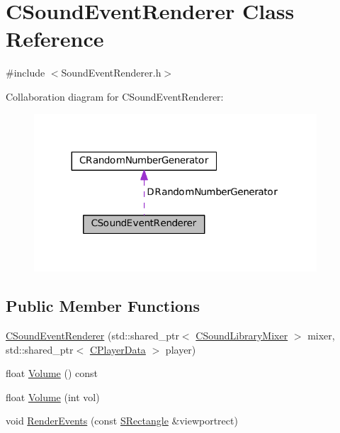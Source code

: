 \hypertarget{classCSoundEventRenderer}{}\section{C\+Sound\+Event\+Renderer Class Reference}
\label{classCSoundEventRenderer}


{\ttfamily \#include $<$Sound\+Event\+Renderer.\+h$>$}



Collaboration diagram for C\+Sound\+Event\+Renderer\+:
\nopagebreak
\begin{figure}[H]
\begin{center}
\leavevmode
\includegraphics[width=299pt]{classCSoundEventRenderer__coll__graph}
\end{center}
\end{figure}
\subsection*{Public Member Functions}
\begin{DoxyCompactItemize}
\item 
\hyperlink{classCSoundEventRenderer_a2a1c105a120bebf386b772a06c2a053a}{C\+Sound\+Event\+Renderer} (std\+::shared\+\_\+ptr$<$ \hyperlink{classCSoundLibraryMixer}{C\+Sound\+Library\+Mixer} $>$ mixer, std\+::shared\+\_\+ptr$<$ \hyperlink{classCPlayerData}{C\+Player\+Data} $>$ player)
\item 
float \hyperlink{classCSoundEventRenderer_a96b3c1c479057daa5f62b73bab6409a3}{Volume} () const
\item 
float \hyperlink{classCSoundEventRenderer_a7266c3416291f3802d6f3476a29285a2}{Volume} (int vol)
\item 
void \hyperlink{classCSoundEventRenderer_aa8b0c3029ea920ae4f4a08b9d9dd1c9c}{Render\+Events} (const \hyperlink{structSRectangle}{S\+Rectangle} \&viewportrect)
\end{DoxyCompactItemize}
